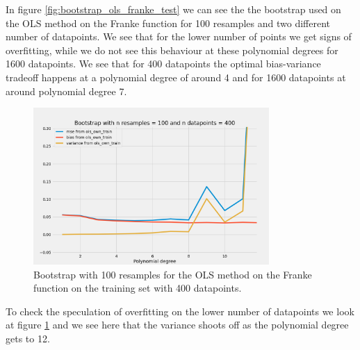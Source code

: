 In figure \ref{fig:bootstrap_ols_franke_test} we can see the the bootstrap used on the OLS method on the Franke function for 100 resamples and two different number of datapoints. We see that for the lower number of points we get signs of overfitting, while we do not see this behaviour at these polynomial degrees for 1600 datapoints. We see that for 400 datapoints the optimal bias-variance tradeoff happens at a polynomial degree of around 4 and for 1600 datapoints at around polynomial degree 7.


    



\begin{figure}[H]
    \centering
    \includegraphics[width=0.8\textwidth]{Figures/c_bootstrap_ols_n_data_400_train_data.png}
    \caption{Bootstrap with 100 resamples for the OLS method on the Franke function on the training set with 400 datapoints.}
    \label{fig:bootstrap_ols_franke_train}
\end{figure}

To check the speculation of overfitting on the lower number of datapoints we look at figure \ref{fig:bootstrap_ols_franke_train} and we see here that the variance shoots off as the polynomial degree gets to 12. 



